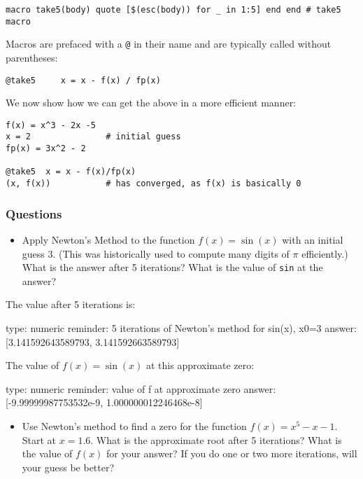 \documentclass[12pt]{article}
\begin{document}
\begin{verbatim}
macro take5(body) quote [$(esc(body)) for _ in 1:5] end end # take5 macro
\end{verbatim}
Macros are prefaced with a \texttt{@} in their name and are typically
called without parentheses:



\begin{verbatim}
@take5     x = x - f(x) / fp(x)
\end{verbatim}
We now show how we can get the above in a more efficient manner:



\begin{verbatim}
f(x) = x^3 - 2x -5
x = 2               # initial guess
fp(x) = 3x^2 - 2

@take5  x = x - f(x)/fp(x)
(x, f(x))           # has converged, as f(x) is basically 0
\end{verbatim}
\subsubsection{Questions}

\begin{itemize}
\itemsep1pt\parskip0pt
\item
  Apply Newton's Method to the function $f(x) = \sin(x)$ with an initial
  guess $3$. (This was historically used to compute many digits of $\pi$
  efficiently.) What is the answer after 5 iterations? What is the value
  of \texttt{sin} at the answer?
\end{itemize}

The value after 5 iterations is:

\begin{answer}
    type: numeric
    reminder: 5 iterations of Newton's method for sin(x), x0=3
    answer: [3.141592643589793, 3.141592663589793]

\end{answer}

The value of $f(x)=\sin(x)$ at this approximate zero:

\begin{answer}
    type: numeric
    reminder: value of f at approximate zero
    answer: [-9.99999987753532e-9, 1.000000012246468e-8]

\end{answer}

\begin{itemize}
\itemsep1pt\parskip0pt
\item
  Use Newton's method to find a zero for the function $f(x)=x^5-x-1$.
  Start at $x=1.6$. What is the approximate root after 5 iterations?
  What is the value of $f(x)$ for your answer? If you do one or two more
  iterations, will your guess be better?
\end{itemize}
\end{document}
